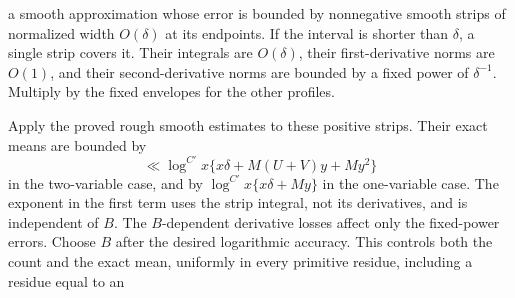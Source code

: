 a smooth approximation whose error is bounded by nonnegative smooth
strips of normalized width $O(\delta)$ at its endpoints.  If the interval
is shorter than $\delta$, a single strip covers it.  Their integrals
are $O(\delta)$, their first-derivative norms are $O(1)$, and their
second-derivative norms are bounded by a fixed power of $\delta^{-1}$.
Multiply by the fixed envelopes for the other profiles.

Apply the proved rough smooth estimates to these positive strips.
Their exact means are bounded by
\[
 \ll\log^{C'}x\{x\delta+M(U+V)y+My^2\}
\]
in the two-variable case, and by
$\log^{C'}x\{x\delta+My\}$ in the one-variable case.
The exponent in the first term uses the strip integral, not its
derivatives, and is independent of $B$.  The $B$-dependent derivative
losses affect only the fixed-power errors.  Choose $B$ after the desired
logarithmic accuracy.  This controls both the count and the exact mean,
uniformly in every primitive residue, including a residue equal to an
